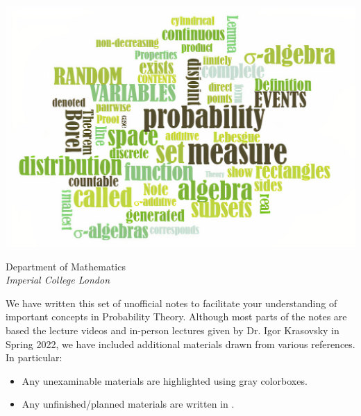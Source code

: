 \begin{titlepage}
{\sffamily
\maketitle
\begin{center}
    \vfill
    \includegraphics[scale = 1.7]{mypic.jpg}
    
    \vspace{4cm}
    \Large
    Department of Mathematics\\
    \textit{Imperial College London}\\
\end{center}}
\end{titlepage}
\newpage

We have written this set of unofficial notes to facilitate your understanding of important concepts in Probability Theory. Although most parts of the notes are based the lecture videos and in-person lectures given by Dr. Igor Krasovsky in Spring 2022, we have included additional materials drawn from various references. In particular: 

\begin{unexaminable}
\begin{itemize}
    \item Any unexaminable materials are highlighted using gray colorboxes.
\end{itemize}
\end{unexaminable}
\begin{itemize}
    \item Any unfinished/planned materials are written in .
\end{itemize}

